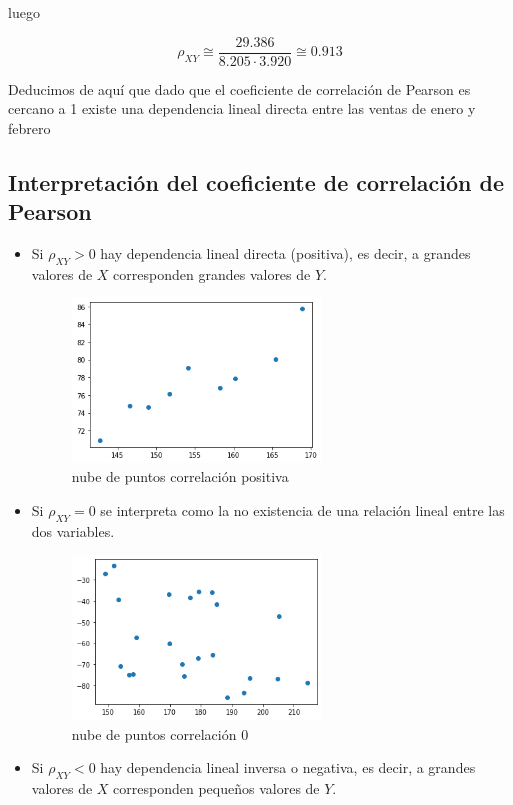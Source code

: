 \documentclass[
]{article}
\begin{document}
luego

\[\rho_{XY}\cong\frac{29.386}{8.205 \cdot 3.920} \cong 0.913\]

Deducimos de aquí que dado que el coeficiente de correlación de Pearson
es cercano a 1 existe una dependencia lineal directa entre las ventas de
enero y febrero

\hypertarget{interpretaciuxf3n-del-coeficiente-de-correlaciuxf3n-de-pearson}{%
\subsection{Interpretación del coeficiente de correlación de
Pearson}\label{interpretaciuxf3n-del-coeficiente-de-correlaciuxf3n-de-pearson}}

\begin{itemize}
\item
  Si \(\rho_{XY}>{0}\) hay dependencia lineal directa (positiva), es
  decir, a grandes valores de \(X\) corresponden grandes valores de
  \(Y\).

  \begin{figure}
  \centering
  \includegraphics[width=2.60417in,height=\textheight]{cloud.png}
  \caption{nube de puntos correlación positiva}
  \end{figure}
\item
  Si \(\rho_{XY} ={0}\) se interpreta como la no existencia de una
  relación lineal entre las dos variables.

  \begin{figure}
  \centering
  \includegraphics[width=2.60417in,height=\textheight]{cloud_cero.png}
  \caption{nube de puntos correlación 0}
  \end{figure}
\item
  Si \(\rho_{XY}<{0}\) hay dependencia lineal inversa o negativa, es
  decir, a grandes valores de \(X\) corresponden pequeños valores de
  \(Y\).


\end{itemize}
\end{document}
